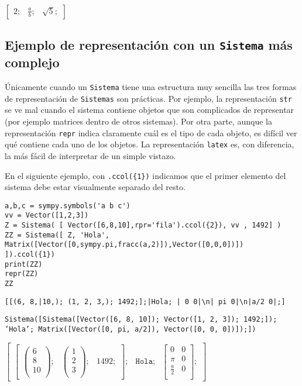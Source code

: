 \documentclass[11pt]{report}
\begin{document}
\(\displaystyle \left[ \begin{array}{cc|c}2;& \frac{a}{b};& \sqrt{5};\end{array} \right]\)

\subsection{Ejemplo de representación con un \texttt{Sistema} más complejo}
\label{sec:org5527972}
Únicamente cuando un \texttt{Sistema} tiene una estructura muy sencilla las
tres formas de representación de \texttt{Sistemas} son prácticas. Por
ejemplo, la representación \texttt{str} se ve mal cuando el sistema contiene
objetos que son complicados de representar (por ejemplo matrices
dentro de otros sistemas). Por otra parte, aunque la representación
\texttt{repr} indica claramente cuál es el tipo de cada objeto, es difícil
ver qué contiene cada uno de los objetos. La representación \texttt{latex}
es, con diferencia, la más fácil de interpretar de un simple vistazo.

En el siguiente ejemplo, con \texttt{.ccol(\{1\})} indicamos que el primer
elemento del sistema debe estar visualmente separado del resto.

\begin{verbatim}
a,b,c = sympy.symbols('a b c')
vv = Vector([1,2,3])
Z = Sistema( [ Vector([6,8,10],rpr='fila').ccol({2}), vv , 1492] ) 
ZZ = Sistema([ Z, 'Hola', Matrix([Vector([0,sympy.pi,fracc(a,2)]),Vector([0,0,0])])  ]).ccol({1})
print(ZZ)
repr(ZZ)
ZZ
\end{verbatim}

\texttt{[[(6, 8,|10,); (1, 2, 3,); 1492;];|Hola; |  0   0|\textbackslash{}n| pi   0|\textbackslash{}n|a/2   0|;]}

\texttt{Sistema([Sistema([Vector([6, 8, 10]); Vector([1, 2, 3]); 1492;]); 'Hola'; Matrix([Vector([0, pi, a/2]), Vector([0, 0, 0])]);])}

\(\displaystyle \left[ \begin{array}{c|cc}\left[ \begin{array}{ccc}\left( \begin{array}{c}6\\8\\ \hline 10\\ \end{array} \right);& \left( \begin{array}{c}1\\2\\3\\ \end{array} \right);& 1492;\end{array} \right];& \mathtt{\text{Hola}};& \left[ \begin{array}{cc}0&0\\\pi&0\\\frac{a}{2}&0\\ \end{array} \right];\end{array} \right]\)
\end{document}
